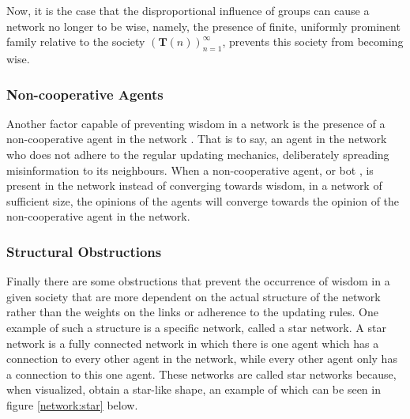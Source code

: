 \documentclass{article}
\newcommand{\T}{\textbf{T}}
\newcommand{\Soc}{(\T(n))^{\infty}_{n=1}}
\begin{document}
Now, it is the case that the disproportional influence of groups can cause a network no longer to be wise, namely, the presence of finite, uniformly prominent family relative to the society $\Soc$, prevents this society from becoming wise.

\subsubsection{Non-cooperative Agents}

Another factor capable of preventing wisdom in a network is the presence of a non-cooperative agent in the network \cite{amir2021robust}. That is to say, an agent in the network who does not adhere to the regular updating mechanics, deliberately spreading misinformation to its neighbours. When a non-cooperative agent, or bot \cite{amir2021robust}, is present in the network instead of converging towards wisdom, in a network of sufficient size, the opinions of the agents will converge towards the opinion of the non-cooperative agent in the network. 

\subsubsection{Structural Obstructions}

Finally there are some obstructions that prevent the occurrence of wisdom in a given society that are more dependent on the actual structure of the network rather than the weights on the links or adherence to the updating rules. One example of such a structure is a specific network, called a star network. A star network is a fully connected network in which there is one agent which has a connection to every other agent in the network, while every other agent only has a connection to this one agent. These networks are called star networks because, when visualized, obtain a star-like shape, an example of which can be seen in figure \ref{network:star} below.
\end{document}
